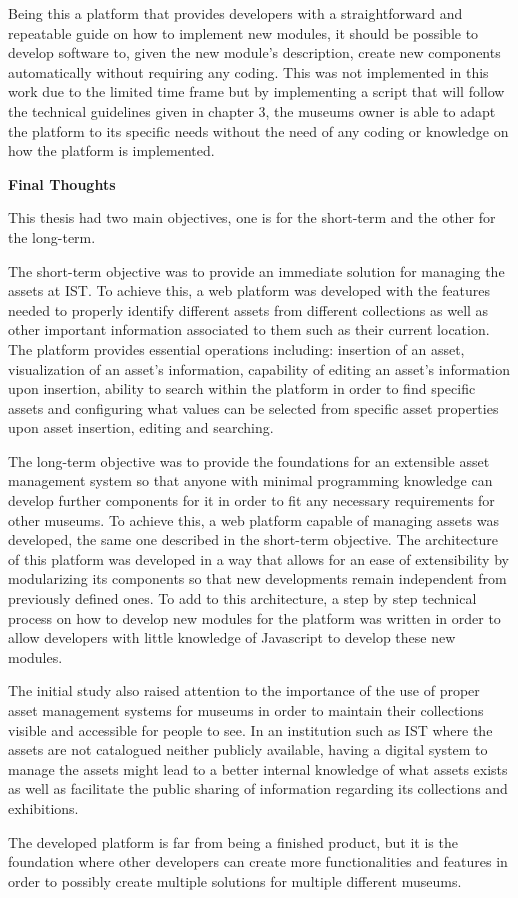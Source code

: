 Being this a platform that provides developers with a straightforward and repeatable guide on how to implement new modules, it should be possible to develop software to, given the new module's description, create new components automatically without requiring any coding. This was not implemented in this work due to the limited time frame but by implementing a script that will follow the technical guidelines given in chapter 3, the museums owner is able to adapt the platform to its specific needs without the need of any coding or knowledge on how the platform is implemented.

\vspace{4mm}
\textbf{Final Thoughts}
\vspace{2mm}

This thesis had two main objectives, one is for the short-term and the other for the long-term.

The short-term objective was to provide an immediate solution for managing the assets at IST. To achieve this, a web platform was developed with the features needed to properly identify different assets from different collections as well as other important information associated to them such as their current location. The platform provides essential operations including: insertion of an asset, visualization of an asset's information, capability of editing an asset's information upon insertion, ability to search within the platform in order to find specific assets and configuring what values can be selected from specific asset properties upon asset insertion, editing and searching.

The long-term objective was to provide the foundations for an extensible asset management system so that anyone with minimal programming knowledge can develop further components for it in order to fit any necessary requirements for other museums. To achieve this, a web platform capable of managing assets was developed, the same one described in the short-term objective. The architecture of this platform was developed in a way that allows for an ease of extensibility by modularizing its components so that new developments remain independent from previously defined ones. To add to this architecture, a step by step technical process on how to develop new modules for the platform was written in order to allow developers with little knowledge of Javascript to develop these new modules.

The initial study also raised attention to the importance of the use of proper asset management systems for museums in order to maintain their collections visible and accessible for people to see. In an institution such as IST where the assets are not catalogued neither publicly available, having a digital system to manage the assets might lead to a better internal knowledge of what assets exists as well as facilitate the public sharing of information regarding its collections and exhibitions.

The developed platform is far from being a finished product, but it is the foundation where other developers can create more functionalities and features in order to possibly create multiple solutions for multiple different museums.

\newpage